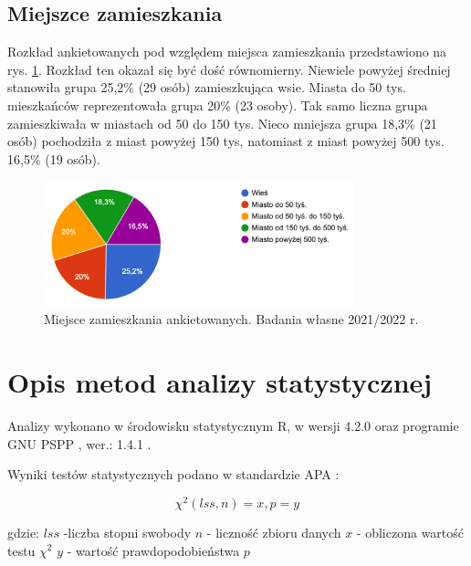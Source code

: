 \documentclass[a4paper,12pt,twoside,openany]{report}
\begin{document}
\subsection*{Miejszce zamieszkania}
Rozkład ankietowanych pod względem miejsca zamieszkania przedstawiono na rys. \ref{rys:zamiesz}. Rozkład ten okazał się być dość równomierny. Niewiele powyżej średniej stanowiła grupa 25,2\%   (29 osób) zamieszkująca  wsie. Miasta do 50 tys. mieszkańców reprezentowała grupa  20\%  (23 osoby). Tak samo liczna grupa zamieszkiwała w miastach od 50 do 150 tys. Nieco mniejsza grupa  18,3\% (21 osób) pochodziła z miast powyżej 150 tys, natomiast z miast powyżej 500 tys.  16,5\% (19 osób).
\begin{figure}[h]
\includegraphics[width=9cm]{char_gr_bad/zamieszka00}
\caption{Miejsce zamieszkania ankietowanych. Badania własne 2021/2022 r.}
\label{rys:zamiesz}
\end{figure}

\section{Opis metod analizy statystycznej}

Analizy wykonano w środowisku statystycznym R, w wersji 4.2.0 \cite{rproject} oraz programie GNU PSPP , wer.: 1.4.1 \cite{gnupspp}. 

\vspace{\baselineskip} 

Wyniki testów statystycznych podano w standardzie APA \cite{apa}:\newline

\begin{equation}
    \chi^2 (lss, n) = x, p=y
\end{equation}

\vspace{\baselineskip} 
gdzie:\newline
$lss$ -liczba stopni swobody\newline
$n$ - liczność zbioru danych\newline
$x$ - obliczona wartość testu $\chi^2$\newline
$y$ - wartość prawdopodobieństwa $p$\newline
\end{document}
